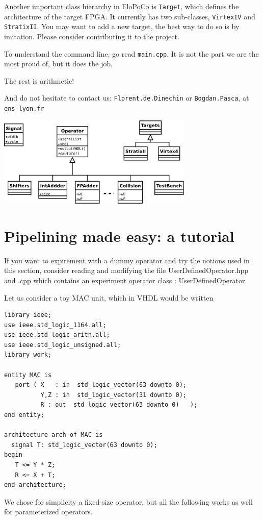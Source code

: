 \documentclass{article}
\begin{document}
Another important class hierarchy in FloPoCo is \texttt{Target}, which
defines the architecture of the target FPGA. It currently has two
sub-classes, \texttt{VirtexIV} and \texttt{StratixII}. You may want to
add a new target, the best way to do so is by imitation. Please
consider contributing it to the project.

To understand the command line, go read \texttt{main.cpp}. It is not
the part we are the most proud of, but it does the job.

The rest is arithmetic!

And do not hesitate to contact us: \texttt{Florent.de.Dinechin} or
\texttt{Bogdan.Pasca}, at \texttt{ens-lyon.fr}

\begin{center}
  \begin{latexonly}
  \includegraphics[width=0.7\textwidth]{../Figures/FloPoCoClasses.pdf}        
  \end{latexonly}
\end{center}


\section{Pipelining made easy: a tutorial}
\label{sec:pme}


If you want to expirement with a dummy operator and try the notions used in this section, consider reading and modifying the file UserDefinedOperator.hpp and .cpp which contains an experiment operator class : UserDefinedOperator.


Let us consider a toy MAC unit, which in VHDL would be written
\begin{verbatim}
library ieee;
use ieee.std_logic_1164.all;
use ieee.std_logic_arith.all;
use ieee.std_logic_unsigned.all;
library work;

entity MAC is
   port ( X   : in  std_logic_vector(63 downto 0);
          Y,Z : in  std_logic_vector(31 downto 0);
          R : out  std_logic_vector(63 downto 0)   );
end entity;

architecture arch of MAC is
  signal T: std_logic_vector(63 downto 0);
begin
   T <= Y * Z;
   R <= X + T;
end architecture;
\end{verbatim}
We chose for simplicity a fixed-size operator, but all the following
works as well for parameterized operators.
\end{document}
